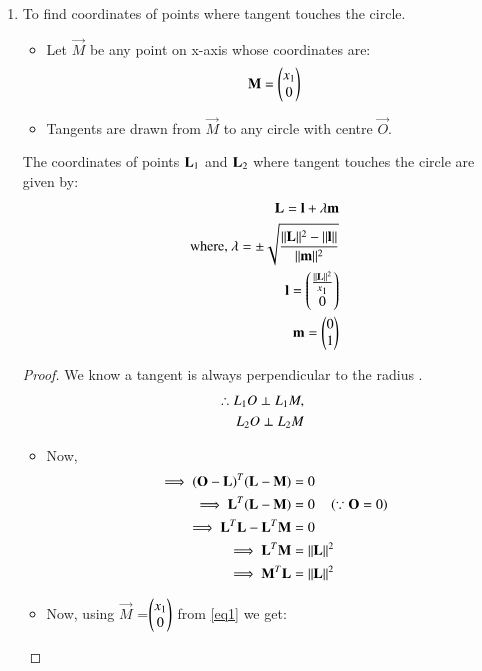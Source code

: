 \documentclass[journal,12pt,twocolumn]{IEEEtran}
\begin{document}
\begin{enumerate}
    \item To find coordinates of points where tangent touches the circle.
\begin{itemize}
    \item Let $\vec{M}$ be any point on x-axis whose coordinates are:
    \begin{align}
    \vec{M} =\myvec{x\textsubscript{1} \\0} \label{eq1}
    \end{align}
    \item Tangents are drawn from $\vec{M}$ to any circle with centre $\vec{O}$.
\end{itemize}
\begin{lemma}
\label{lemma}
The coordinates of points $\vec{L\textsubscript{1}}$ and $\vec{L\textsubscript{2}}$ where tangent touches the circle are given by:
\begin{align}
\vec{L}=\vec{l}+\lambda \vec{m} \label{eq2}
\\
\text{ where, }  \lambda = \pm\sqrt{\frac{\norm{\vec{L}}^2-\norm{\vec{l}}}{\norm{\vec{m}}^2}}
\\
\vec{l}=\myvec{\frac{\norm{\vec{L}}^2}{x\textsubscript{1}}\\0}
\\
\vec{m}=\myvec{0\\1} 
\end{align}
\end{lemma}
\begin{proof}
We know a tangent is always perpendicular to the radius .
\begin{align}
\therefore L\textsubscript{1}O \perp L\textsubscript{1}M, 
\\
L\textsubscript{2}O \perp L\textsubscript{2}M
\end{align}
\begin{itemize}
\item Now,
\begin{align}
 \implies (\vec{O}-\vec{L})^T (\vec{L}-\vec{M}) &= 0
 \\
 \implies\vec{L}^T(\vec{L}-\vec{M})&= 0 \quad \brak{\because \vec{O}=0}
 \\
  \implies\vec{L}^T \vec{L} - \vec{L}^T \vec{M} &= 0  
  \\
  \implies \vec{L}^T \vec{M} &=\norm{\vec{L}}^2
  \\
 \implies   \vec{M}^T \vec{L} &=\norm{\vec{L}}^2
  \end{align}
  \item Now, using $\vec{M}$ =$\myvec{x\textsubscript{1} \\0}$ from \eqref{eq1} we get:

\end{itemize}
\end{proof}
\end{enumerate}
\end{document}
